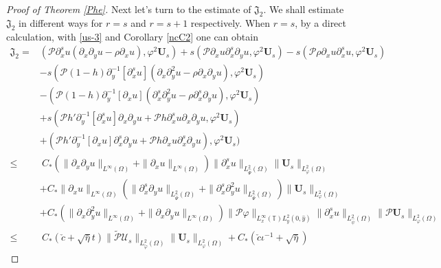 \documentclass[10pt,a4paper]{amsart}
\begin{document}
\begin{proof}[Proof of Theorem \ref{Phe}]
Next let's turn to the estimate of $\mathfrak{J}_{2}$. We shall estimate $\mathfrak{J}_{2}$ in different ways for $r=s$ and $r=s+1$ respectively.
When $r=s$, by a direct calculation,  with \eqref{us-3} and Corollary \ref{ncC2} one can obtain
\begin{align}\label{JJ2(1)}
\mathfrak{J}_{2}
=& (\mathcal{P}\partial_{x}^{s}u(\partial_{x}\partial_{y}u-\rho\partial_{x}u),\varphi^{2}\mathbf{U}_{s})
  +s(\mathcal{P}\partial_{x}u\partial_{x}^{s}\partial_{y}u,\varphi^{2}\mathbf{U}_{s})
  -s(\mathcal{P}\rho\partial_{x}u\partial_{x}^{s}u,\varphi^{2}\mathbf{U}_{s})\\
 &-s(\mathcal{P}(1-h)\partial_{y}^{-1}[\partial_{x}^{s}u](\partial_{x}\partial_{y}^{2}u-\rho\partial_{x}\partial_{y}u),\varphi^{2}\mathbf{U}_{s})\nonumber\\
 &-(\mathcal{P}(1-h)\partial_{y}^{-1}[\partial_{x}u](\partial_{x}^{s}\partial_{y}^{2}u-\rho\partial_{x}^{s}\partial_{y}u),\varphi^{2}\mathbf{U}_{s})\nonumber\\
 &+s(\mathcal{P}h'\partial_{y}^{-1}[\partial_{x}^{s}u]\partial_{x}\partial_{y}u+\mathcal{P}h\partial_{x}^{s}u\partial_{x}\partial_{y}u,\varphi^{2}\mathbf{U}_{s})\nonumber\\
 &+(\mathcal{P}h'\partial_{y}^{-1}[\partial_{x}u]\partial_{x}^{s}\partial_{y}u+\mathcal{P}h\partial_{x}u\partial_{x}^{s}\partial_{y}u),\varphi^{2}\mathbf{U}_{s})\nonumber\\
\leq&~C_{*}\left(\|\partial_{x}\partial_{y}u\|_{L^{\infty}(\Omega)}+\|\partial_{x}u\|_{L^{\infty}(\Omega)}\right)
           \|\partial_{x}^{s}u\|_{L_{\hat{\Psi}}^{2}(\Omega)}\|\mathbf{U}_{s}\|_{L_{\varphi}^{2}(\Omega)}\nonumber\\
    &+C_{*}\|\partial_{x}u\|_{L^{\infty}(\Omega)}
           \left(\|\partial_{x}^{s}\partial_{y}u\|_{L_{\hat{\Psi}}^{2}(\Omega)}+\|\partial_{x}^{s}\partial_{y}^{2}u\|_{L_{\hat{\Psi}}^{2}(\Omega)}\right)
           \|\mathbf{U}_{s}\|_{L_{\varphi}^{2}(\Omega)}\nonumber\\
    &+C_{*}(\|\partial_{x}\partial_{y}^{2}u\|_{L^{\infty}(\Omega)}+\|\partial_{x}\partial_{y}u\|_{L^{\infty}(\Omega)})
           \|\mathcal{P}\varphi\|_{L_{x}^{\infty}(\mathbb{T})L_{y}^{2}(0,\hat{y})}\|\partial_{x}^{s}u\|_{L_{\hat{\psi}}^{2}(\Omega)}\|\mathcal{P}\mathbf{U}_{s}\|_{L_{\varphi}^{2}(\Omega)}\nonumber\\
\leq&~C_{*}(\check{c}+\sqrt{\bar{\eta}}t)
           \|\tilde{\mathcal{P}}\mathcal{U}_{s}\|_{L_{\tilde{\varphi}}^{2}(\Omega)}\|\mathbf{U}_{s}\|_{L_{\varphi}^{2}(\Omega)}
     +C_{*}(\check{c}\iota^{-1}+\sqrt{\bar{\eta}})

\end{align}
\end{proof}
\end{document}
